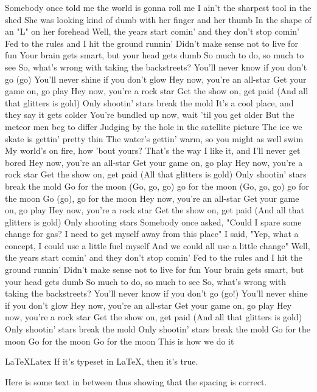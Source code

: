 \documentclass[titlepage,oneside,letterpaper,11pt]{article} %
\begin{document}
Somebody once told me the world is gonna roll me
I ain't the sharpest tool in the shed
She was looking kind of dumb with her finger and her thumb
In the shape of an "L" on her forehead
Well, the years start comin' and they don't stop comin'
Fed to the rules and I hit the ground runnin'
Didn't make sense not to live for fun
Your brain gets smart, but your head gets dumb
So much to do, so much to see
So, what's wrong with taking the backstreets?
You'll never know if you don't go (go)
You'll never shine if you don't glow
Hey now, you're an all-star
Get your game on, go play
Hey now, you're a rock star
Get the show on, get paid
(And all that glitters is gold)
Only shootin' stars break the mold
It's a cool place, and they say it gets colder
You're bundled up now, wait 'til you get older
But the meteor men beg to differ
Judging by the hole in the satellite picture
The ice we skate is gettin' pretty thin
The water's gettin' warm, so you might as well swim
My world's on fire, how 'bout yours?
That's the way I like it, and I'll never get bored
Hey now, you're an all-star
Get your game on, go play
Hey now, you're a rock star
Get the show on, get paid
(All that glitters is gold)
Only shootin' stars break the mold
Go for the moon
(Go, go, go) go for the moon
(Go, go, go) go for the moon
Go (go), go for the moon
Hey now, you're an all-star
Get your game on, go play
Hey now, you're a rock star
Get the show on, get paid
(And all that glitters is gold)
Only shooting stars
Somebody once asked, "Could I spare some change for gas?
I need to get myself away from this place"
I said, "Yep, what a concept, I could use a little fuel myself
And we could all use a little change"
Well, the years start comin' and they don't stop comin'
Fed to the rules and I hit the ground runnin'
Didn't make sense not to live for fun
Your brain gets smart, but your head gets dumb
So much to do, so much to see
So, what's wrong with taking the backstreets?
You'll never know if you don't go (go!)
You'll never shine if you don't glow
Hey now, you're an all-star
Get your game on, go play
Hey now, you're a rock star
Get the show on, get paid
(And all that glitters is gold)
Only shootin' stars break the mold
Only shootin' stars break the mold
Go for the moon
Go for the moon
Go for the moon
This is how we do it

\begin{theorembox}{\LaTeX}{Latex}
    If it's typeset in \LaTeX, then it's true.
\end{theorembox}

Here is some text in between thus showing that the spacing is correct.
\end{document}
